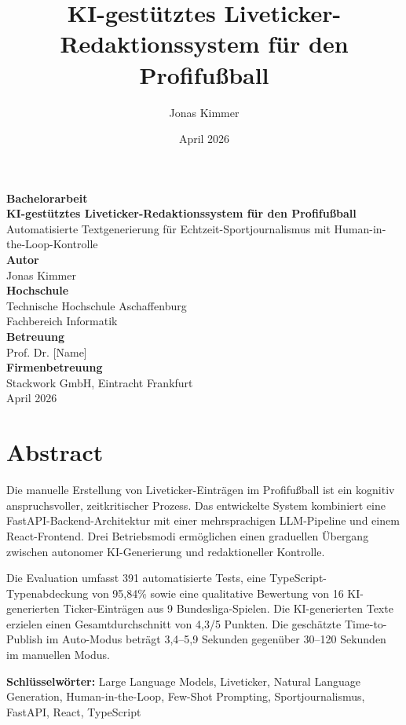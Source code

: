\documentclass[12pt,a4paper,ngerman]{report}
\title{KI-gestütztes Liveticker-Redaktionssystem für den Profifußball}
\author{Jonas Kimmer}
\date{April 2026}
\begin{document}
\begin{titlepage}
\centering
\vspace*{3cm}
{\Large \textbf{Bachelorarbeit}}\\[2cm]
{\LARGE \textbf{KI-gestütztes Liveticker-Redaktionssystem für den Profifußball}}\\[0.5cm]
{\large Automatisierte Textgenerierung für Echtzeit-Sportjournalismus mit Human-in-the-Loop-Kontrolle}\\[3cm]
{\large \textbf{Autor}}\\
Jonas Kimmer\\[3cm]
{\large \textbf{Hochschule}}\\
Technische Hochschule Aschaffenburg\\[0.5cm]
Fachbereich Informatik\\[3cm]
{\large \textbf{Betreuung}}\\
Prof. Dr. [Name]\\[3cm]
{\large \textbf{Firmenbetreuung}}\\
Stackwork GmbH, Eintracht Frankfurt\\[3cm]
{\large April 2026}
\end{titlepage}

\chapter*{Abstract}

Die manuelle Erstellung von Liveticker-Einträgen im Profifußball ist ein kognitiv anspruchsvoller, zeitkritischer Prozess. Das entwickelte System kombiniert eine FastAPI-Backend-Architektur mit einer mehrsprachigen LLM-Pipeline und einem React-Frontend. Drei Betriebsmodi ermöglichen einen graduellen Übergang zwischen autonomer KI-Generierung und redaktioneller Kontrolle.

Die Evaluation umfasst 391 automatisierte Tests, eine TypeScript-Typenabdeckung von 95,84\% sowie eine qualitative Bewertung von 16 KI-generierten Ticker-Einträgen aus 9 Bundesliga-Spielen. Die KI-generierten Texte erzielen einen Gesamtdurchschnitt von 4,3/5 Punkten. Die geschätzte Time-to-Publish im Auto-Modus beträgt 3,4--5,9 Sekunden gegenüber 30--120 Sekunden im manuellen Modus.

\noindent\textbf{Schlüsselwörter:} Large Language Models, Liveticker, Natural Language Generation, Human-in-the-Loop, Few-Shot Prompting, Sportjournalismus, FastAPI, React, TypeScript

\tableofcontents










\appendix

\end{document}
